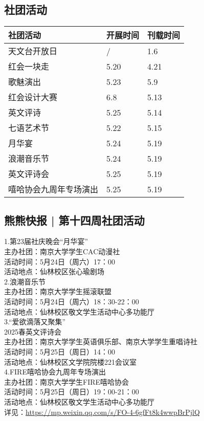 \documentclass[letterpaper, 12pt]{article}
\begin{document}
\begin{multicols}{2}
\section{社团活动}
\begin{tabular}{|>{\centering\arraybackslash}m{}|m{}|m{}|}
    \hline
    社团活动 & 开展时间 & 刊载时间\\
    \hline\hline
    天文台开放日 & / & 1.6\\
    红会一块走 & 5.20 & 4.21\\
    歌魅演出 & 5.23 & 5.9\\
    红会设计大赛 & 6.8 & 5.13\\
    英文评诗 & 5.25 & 5.14\\
    七语艺术节 & 5.22 & 5.15\\
    月华宴 & 5.24 & 5.19\\
    浪潮音乐节 & 5.24 & 5.19\\
    英文评诗会 & 5.25 & 5.19\\
    嘻哈协会九周年专场演出 & 5.25 & 5.19\\
    \hline
\end{tabular}
\subsection{熊熊快报 | 第十四周社团活动} %
1.第23届社庆晚会“月华宴”
\\主办社团：南京大学学生CAC动漫社
\\活动时间：5月24日（周六）17：00
\\活动地点：仙林校区张心瑜剧场
\\2.浪潮音乐节
\\主办社团：南京大学学生摇滚联盟
\\活动时间：5月24日（周六）18：30-22：00
\\活动地点：仙林校区敬文学生活动中心多功能厅
\\3.“爱欲滴落又聚集”
\\2025春英文评诗会
\\主办社团：南京大学学生英语俱乐部、南京大学学生重唱诗社
\\活动时间：5月25日（周日）14：00
\\活动地点：仙林校区文学院院楼221会议室
\\4.FIRE嘻哈协会九周年专场演出
\\主办社团：南京大学学生FIRE嘻哈协会
\\活动时间：5月25日（周日）19：00-21：00
\\活动地点：仙林校区敬文学生活动中心多功能厅
\\详见：\url{https://mp.weixin.qq.com/s/FO-4-6gfFt8k4wwpBrPjlQ}

\end{multicols}
\end{document}
